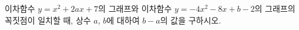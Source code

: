 \hspace*{2mm}\begin{minipage}[t]{\dimexpr\linewidth-2mm\relax}\vspace{0pt}
이차함수 $y=x^2+2ax+7$의 그래프와 이차함수 $y=-4x^2-8x+b-2$의 그래프의 꼭짓점이 일치할 때, 상수 $a$, $b$에 대하여 $b-a$의 값을 구하시오.\end{minipage}

